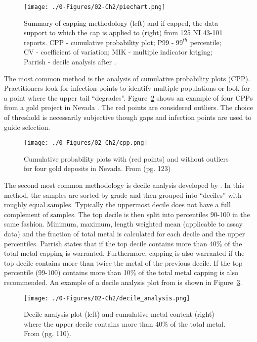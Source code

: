 \begin{figure}[htb!]
    \centering
    \texttt{[image: ./0-Figures/02-Ch2/piechart.png]}
    \caption{Summary of capping methodology (left) and if capped, the data support to which the cap is applied to (right) from 125 NI 43-101 reports. CPP - cumulative probability plot; P99 - $99^{th}$ percentile; CV - coefficient of variation; MIK - multiple indicator kriging; Parrish - decile analysis after \cite{parrish1997geologist}.}
    \label{fig:piechart}
\end{figure}

The most common method is the analysis of cumulative probability plots (CPP). Practitioners look for infection points to identify multiple populations or look for a point where the upper tail ``degrades''. Figure~\ref{fig:cpp} shows an example of four CPPs from a gold project in Nevada \citep{fiore2021}. The red points are considered outliers. The choice of threshold is necessarily subjective though gaps and infection points are used to guide selection.

\begin{figure}[htb!]
    \centering
    \texttt{[image: ./0-Figures/02-Ch2/cpp.png]}
    \caption{Cumulative probability plots with (red points) and without outliers for four gold deposits in Nevada. From \cite{fiore2021} (pg. 123)}
    \label{fig:cpp}
\end{figure}

The second most common methodology is decile analysis developed by \cite{parrish1997geologist}. In this method, the samples are sorted by grade and then grouped into ``deciles'' with roughly equal samples. Typically the uppermost decile does not have a full complement of samples. The top decile is then split into percentiles 90-100 in the same fashion. Minimum, maximum, length weighted mean (applicable to assay data) and the fraction of total metal is calculated for each decile and the upper percentiles. Parrish states that if the top decile contains more than 40\% of the total metal capping is warranted. Furthermore, capping is also warranted if the top decile contains more than twice the metal of the previous decile. If the top percentile (99-100) contains more than 10\% of the total metal capping is also recommended. An example of a decile analysis plot from \cite{cartier2020} is shown in Figure~\ref{fig:decile}.

\begin{figure}[htb!]
    \centering
    \texttt{[image: ./0-Figures/02-Ch2/decile\_analysis.png]}
    \caption{Decile analysis plot (left) and cumulative metal content (right) where the upper decile contains more than 40\% of the total metal. From \cite{cartier2020} (pg. 110).}
    \label{fig:decile}
\end{figure}

